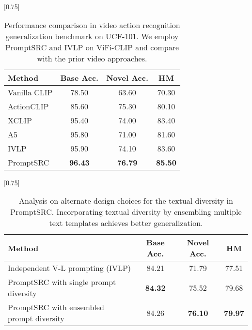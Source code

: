 \documentclass[10pt,twocolumn,letterpaper]{article}
\newcommand{\tablestyle}[2]{\setlength{\tabcolsep}{#1}\renewcommand{\arraystretch}{#2}\centering\footnotesize}
\begin{document}
\begin{center}
\begin{table}[t!]
    \small \centering
 \setlength{\tabcolsep}{20pt}
    \scalebox{0.75}[0.75]{
    \begin{tabular}{lccc}
    \toprule
    Method  & Base Acc. & Novel Acc. & HM\\
    \midrule
Vanilla CLIP  & 78.50 & 63.60  & 70.30 \\
    ActionCLIP &  {85.60 } & {75.30} & {{80.10}}\\
    XCLIP   & 95.40  & 74.00 & 83.40 \\
    A5 &  {95.80  } & {71.00} & {81.60}\\
    \midrule
    IVLP & 95.90 & 74.10 & 83.60 \\
   \rowcolor{tabhighlight}  PromptSRC &  \textbf{96.43 } & \textbf{76.79} & \textbf{85.50}\\
    \bottomrule
    \end{tabular}}\vspace{-0.5em}
    \caption{Performance comparison in video action recognition generalization benchmark on UCF-101. We employ PromptSRC and IVLP on ViFi-CLIP and compare with the prior video approaches.}
    \label{tab_appendix:video_task}
\end{table} \begin{table}[!t]
    \small \centering
 \setlength{\tabcolsep}{6pt}
    \scalebox{0.75}[0.75]{
    \begin{tabular}{l cc | c }
    \toprule
    Method  & Base Acc. & Novel Acc. & HM\\
    \midrule
    Independent V-L prompting (IVLP) & 84.21 & 71.79 & 77.51 \\
    PromptSRC with single prompt diversity & \textbf{84.32}	&75.52&	79.68 \\
    \rowcolor{tabhighlight}
    PromptSRC with ensembled prompt diversity & {84.26} & \textbf{76.10} & \textbf{79.97} \\
    \bottomrule
    \end{tabular}
    }\vspace{-0.5em}
    \caption{Analysis on alternate design choices for the textual diversity in PromptSRC. Incorporating textual diversity by ensembling multiple text templates achieves better generalization.
    }
    \label{tab_appendix:alternate_textual_diversity}
\end{table} 
\begin{table}[t!]
\centering
\tablestyle{-12pt}{1.1}
\addtolength{\tabcolsep}{+14pt}
\end{table}
\end{center}
\end{document}

